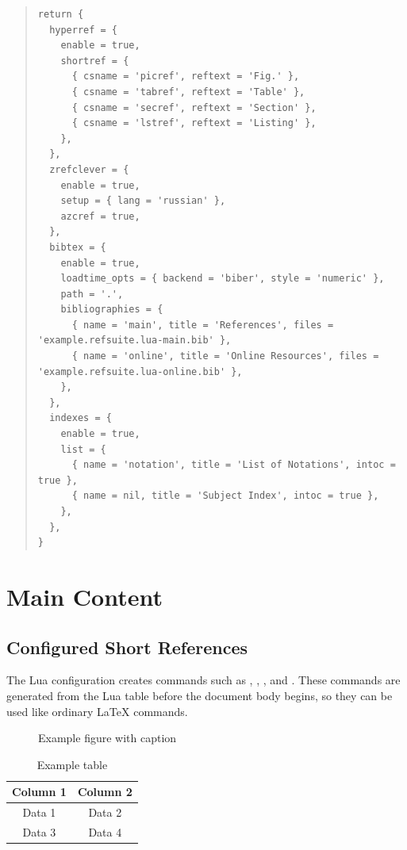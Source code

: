 \documentclass{article}
\newcounter{listing}
\begin{document}
\begin{quote}
\begin{verbatim}
return {
  hyperref = {
    enable = true,
    shortref = {
      { csname = 'picref', reftext = 'Fig.' },
      { csname = 'tabref', reftext = 'Table' },
      { csname = 'secref', reftext = 'Section' },
      { csname = 'lstref', reftext = 'Listing' },
    },
  },
  zrefclever = {
    enable = true,
    setup = { lang = 'russian' },
    azcref = true,
  },
  bibtex = {
    enable = true,
    loadtime_opts = { backend = 'biber', style = 'numeric' },
    path = '.',
    bibliographies = {
      { name = 'main', title = 'References', files = 'example.refsuite.lua-main.bib' },
      { name = 'online', title = 'Online Resources', files = 'example.refsuite.lua-online.bib' },
    },
  },
  indexes = {
    enable = true,
    list = {
      { name = 'notation', title = 'List of Notations', intoc = true },
      { name = nil, title = 'Subject Index', intoc = true },
    },
  },
}
\end{verbatim}
\end{quote}
\label{lst:configuration}

\section{Main Content}

\subsection{Configured Short References}

The Lua configuration creates commands such as ,
, , and .
These commands are generated from the Lua table before the document body begins,
so they can be used like ordinary LaTeX commands.

\begin{figure}[htbp]
  \centering
  \caption{Example figure with caption}
  \label{fig:sample}
\end{figure}

\begin{table}[htbp]
  \centering
  \begin{tabular}{|c|c|}
    \hline
    Column 1 & Column 2 \\
    \hline
    Data 1 & Data 2 \\
    Data 3 & Data 4 \\
    \hline
  \end{tabular}
  \caption{Example table}
  \label{tab:sample}
\end{table}
\end{document}
